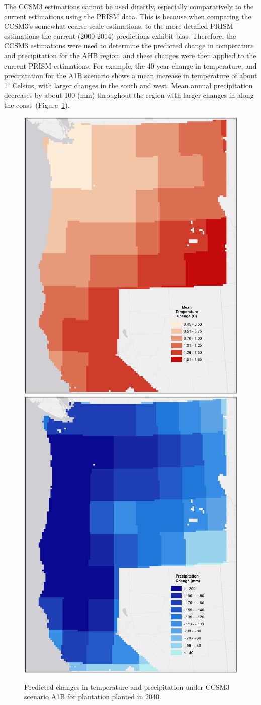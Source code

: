 \documentclass[preprint,12pt]{elsarticle}
\newcommand{\degree}{\ensuremath{{}^{\circ}}\xspace}
\begin{document}
The \ac{CCSM3} estimations cannot be used directly, especially
comparatively to the current estimations using the \ac{PRISM} data.
This is because when comparing the \ac{CCSM3}'s somewhat coarse scale
estimations, to the more detailed \ac{PRISM} estimations the current
(2000-2014) predictions exhibit bias.  Therefore, the \ac{CCSM3}
estimations were used to determine the predicted change in temperature
and precipitation for the \ac {AHB} region, and these changes were
then applied to the current \ac{PRISM} estimations. For example, the
40 year change in temperature, and precipitation for the A1B scenario
shows a mean increase in temperature of about 1\degree Celsius, with
larger changes in the south and west.  Mean annual precipitation
decreases by about 100 (mm) throughout the region with larger changes
in along the coast~(Figure~\ref{fig:change}).

\begin{figure}[hp]
  \centering
  \includegraphics[width=0.45\linewidth]{temp_change}
  \includegraphics[width=0.45\linewidth]{precip_change.png}
  \caption{Predicted changes in temperature and precipitation under \ac{CCSM3} scenario A1B for plantation planted in 2040.}
  \label{fig:change}
\end{figure}
\end{document}
